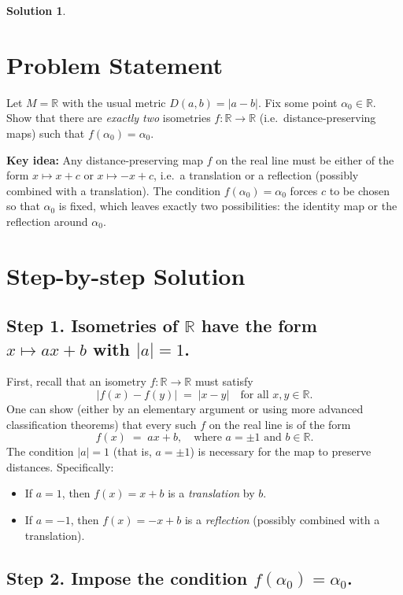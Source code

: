 \documentclass[12pt]{article}
\theoremstyle{definition} %
\newtheorem{solution}{Solution}
\theoremstyle{plain} %
\begin{document}
\begin{solution}
    \section*{Problem Statement}
Let $M = \mathbb{R}$ with the usual metric $D(a,b) = |a - b|$. Fix some point $\alpha_0 \in \mathbb{R}$. Show that there are \emph{exactly two} isometries $f: \mathbb{R} \to \mathbb{R}$ (i.e.\ distance-preserving maps) such that $f(\alpha_0) = \alpha_0$.

\medskip

\textbf{Key idea:} Any distance-preserving map $f$ on the real line must be either of the form $x \mapsto x + c$ or $x \mapsto -x + c$, i.e.\ a translation or a reflection (possibly combined with a translation). The condition $f(\alpha_0) = \alpha_0$ forces $c$ to be chosen so that $\alpha_0$ is fixed, which leaves exactly two possibilities: the identity map or the reflection around $\alpha_0$.

\section*{Step-by-step Solution}

\subsection*{Step 1. Isometries of $\mathbb{R}$ have the form $x \mapsto ax + b$ with $|a| = 1$.}

First, recall that an isometry $f : \mathbb{R} \to \mathbb{R}$ must satisfy
\[
   |f(x) - f(y)| \;=\; |x - y|
   \quad\text{for all } x,y \in \mathbb{R}.
\]
One can show (either by an elementary argument or using more advanced classification theorems) that every such $f$ on the real line is of the form
\[
   f(x) \;=\; ax + b,
   \quad
   \text{where } a = \pm 1 \text{ and } b \in \mathbb{R}.
\]
The condition $|a|=1$ (that is, $a = \pm 1$) is necessary for the map to preserve distances. Specifically:
\begin{itemize}
    \item If $a = 1$, then $f(x) = x + b$ is a \emph{translation} by $b$.
    \item If $a = -1$, then $f(x) = -x + b$ is a \emph{reflection} (possibly combined with a translation).
\end{itemize}

\subsection*{Step 2. Impose the condition $f(\alpha_0) = \alpha_0$.}


\end{solution}
\end{document}
